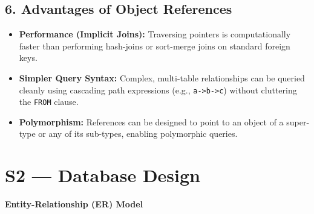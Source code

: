 \documentclass[12pt,a3paper]{article}
\newcommand{\subtopic}[2]{%
  \vspace{10pt}
  \noindent\begin{tcolorbox}[colback=#1!8,colframe=#1,boxrule=0.6pt,arc=4pt,
    left=6pt,right=6pt,top=4pt,bottom=4pt]
    \small\bfseries\textcolor{#1}{#2}
  \end{tcolorbox}
  \vspace{2pt}
}
\begin{document}
\begin{enumerate}
\begin{tcolorbox}[enhanced,breakable,ansbox,colback=cA!4,colframe=cA,boxrule=0.8pt,arc=5pt,title={\textbf{Answer}},fonttitle=\bfseries\color{white},colbacktitle=cA]
\subsection*{6. Advantages of Object References}
\begin{itemize}
    \item \textbf{Performance (Implicit Joins):} Traversing pointers is computationally faster than performing hash-joins or sort-merge joins on standard foreign keys.
    \item \textbf{Simpler Query Syntax:} Complex, multi-table relationships can be queried cleanly using cascading path expressions (e.g., \texttt{a->b->c}) without cluttering the \texttt{FROM} clause.
    \item \textbf{Polymorphism:} References can be designed to point to an object of a super-type or any of its sub-types, enabling polymorphic queries.
\end{itemize}

\end{tcolorbox}

\end{enumerate}

\section{S2 --- Database Design}
\label{sec:S2}

\subtopic{cA}{Entity-Relationship (ER) Model}
\label{sub:s2-er}
\end{document}

